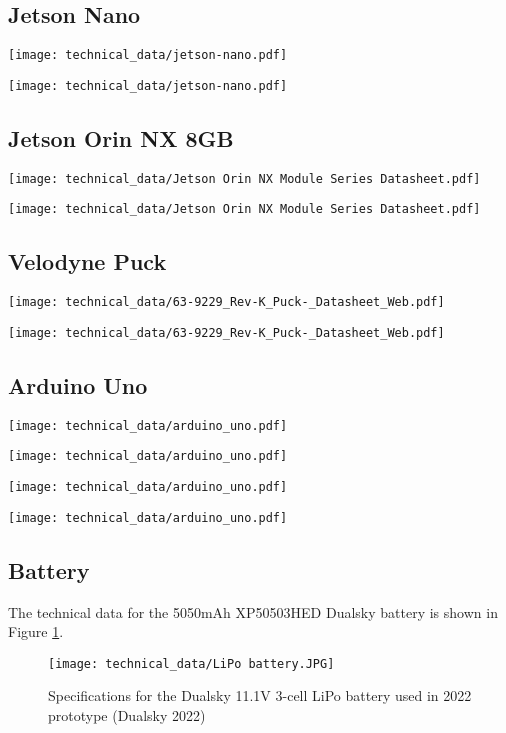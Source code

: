 \subsection{Jetson Nano}
\texttt{[image: technical\_data/jetson-nano.pdf]}

\texttt{[image: technical\_data/jetson-nano.pdf]}

\newpage\subsection{Jetson Orin NX 8GB}
\texttt{[image: technical\_data/Jetson Orin NX Module Series Datasheet.pdf]}

\texttt{[image: technical\_data/Jetson Orin NX Module Series Datasheet.pdf]}

\newpage\subsection{Velodyne Puck}
\texttt{[image: technical\_data/63-9229\_Rev-K\_Puck-\_Datasheet\_Web.pdf]}

\texttt{[image: technical\_data/63-9229\_Rev-K\_Puck-\_Datasheet\_Web.pdf]}

\newpage\subsection{Arduino Uno}
\texttt{[image: technical\_data/arduino\_uno.pdf]}

\texttt{[image: technical\_data/arduino\_uno.pdf]}

\texttt{[image: technical\_data/arduino\_uno.pdf]}

\texttt{[image: technical\_data/arduino\_uno.pdf]}

\newpage\subsection{Battery}
The technical data for the 5050mAh XP50503HED Dualsky battery is shown in Figure \ref{fig:dualsky}.

\begin{figure}[H]
    \centering
    \texttt{[image: technical\_data/LiPo battery.JPG]}
    \caption{Specifications for the Dualsky 11.1V 3-cell LiPo battery used in 2022 prototype
(Dualsky 2022)}
\label{fig:dualsky}
\end{figure}

